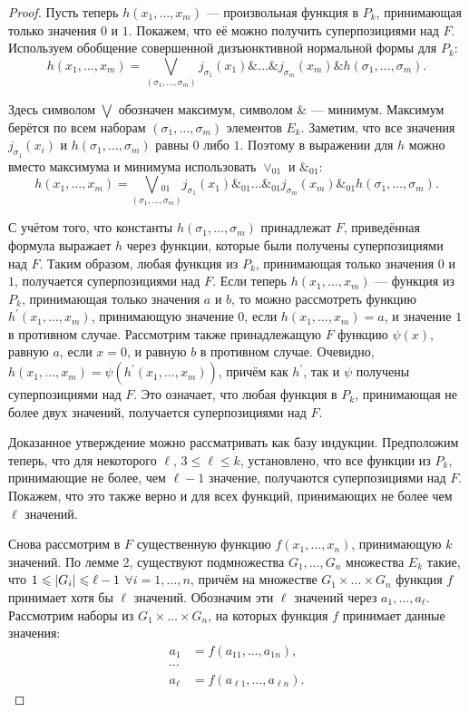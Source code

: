 \begin{proof}
    Пусть теперь $h(x_1, \ldots, x_m)$ --- произвольная функция в $P_k$, принимающая только значения $0$ и $1$. Покажем, что её можно получить суперпозициями над $F$. Используем обобщение совершенной дизъюнктивной нормальной формы для $P_k$:
    \[
        h(x_1, \ldots, x_m) = \bigvee_{(\sigma_1, \ldots, \sigma_m)}j_{\sigma_1}(x_1) \& \ldots \& j_{\sigma_m}(x_m) \& h(\sigma_1, \ldots, \sigma_m).
    \]

    Здесь символом $\bigvee$ обозначен максимум, символом $\&$ --- минимум. Максимум берётся по всем наборам $(\sigma_1, \ldots, \sigma_m)$ элементов $E_k$. Заметим, что все значения $j_{\sigma_1}(x_i)$ и $h(\sigma_1, \ldots, \sigma_m)$ равны $0$ либо $1$. Поэтому в выражении для $h$ можно вместо максимума и минимума использовать $\vee_{01}$ и $\&_{01}$:
    \[
        h(x_1, \ldots, x_m) = \underset{{(\sigma_1, \ldots, \sigma_m)}}{\bigvee{_{01}}}j_{\sigma_1}(x_1) \&_{01} \ldots \&_{01} j_{\sigma_m}(x_m) \&_{01} h(\sigma_1, \ldots, \sigma_m).
    \]
    
    С учётом того, что константы $h(\sigma_1, \ldots, \sigma_m)$ принадлежат $F$, приведённая формула выражает $h$ через функции, которые были получены суперпозициями над $F$. Таким образом, любая функция из $P_k$, принимающая только значения $0$ и $1$, получается суперпозициями над $F$. Если теперь $h(x_1, \ldots, x_m)$ --- функция из $P_k$, принимающая только значения $a$ и $b$, то можно рассмотреть функцию $h^\prime(x_1, \ldots, x_m)$, принимающую значение $0$, если $h(x_1, \ldots, x_m) = a$, и значение $1$ в противном случае. Рассмотрим также принадлежащую $F$ функцию $\psi(x)$, равную $a$, если $x = 0$, и равную $b$ в противном случае. Очевидно, $h(x_1, \ldots, x_m) = \psi(h^\prime(x_1, \ldots, x_m))$, причём как $h^\prime$, так и $\psi$ получены суперпозициями над $F$. Это означает, что любая функция в $P_k$, принимающая не более двух значений, получается суперпозициями над $F$.

    Доказанное утверждение можно рассматривать как базу индукции. Предположим теперь, что для некоторого $\ell$, $3 \leqslant \ell \leqslant k$, установлено, что все функции из $P_k$, принимающие не более, чем $\ell - 1$ значение, получаются суперпозициями над $F$. Покажем, что это также верно и для всех функций, принимающих не более чем $\ell$ значений.

    Снова рассмотрим в $F$ существенную функцию $f(x_1, \ldots, x_n)$, принимающую $k$ значений. По лемме 2, существуют подмножества $G_1, \ldots, G_n$ множества $E_k$ такие, что $1 \leqslant \left\lvert G_i\right\rvert \leqslant \ell - 1$ $\forall i = 1, \ldots, n$, причём на множестве $G_1 \times \ldots \times G_n$ функция $f$ принимает хотя бы $\ell$ значений. Обозначим эти $\ell$ значений через $a_1, \ldots, a_\ell$. Рассмотрим наборы из $G_1 \times \ldots \times G_n$, на которых функция $f$ принимает данные значения:
    \begin{align*}
        a_1 &= f(a_{11}, \ldots, a_{1n}),\\
        \cdots\\
        a_\ell &= f(a_{\ell 1}, \ldots, a_{\ell n}).
    \end{align*}


\end{proof}
